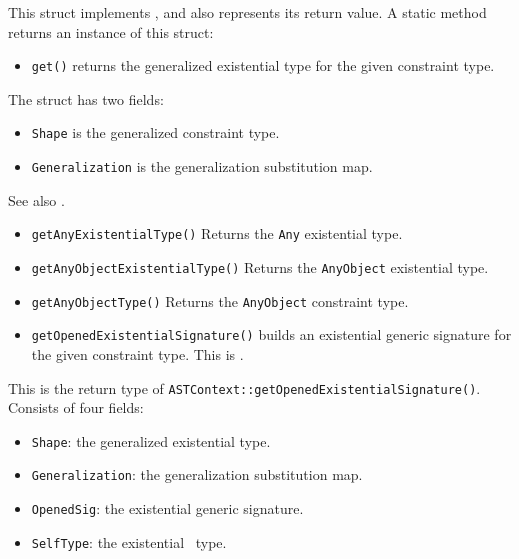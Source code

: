 \documentclass[../generics]{subfiles}
\begin{document}
This struct implements , and also represents its return value.
A static method returns an instance of this struct:
\begin{itemize}
\item \texttt{get()} returns the generalized existential type for the given constraint type.
\end{itemize}
The struct has two fields:
\begin{itemize}
\item \texttt{Shape} is the generalized constraint type.
\item \texttt{Generalization} is the generalization substitution map.
\end{itemize}

See also .
\begin{itemize}
\item \texttt{getAnyExistentialType()} Returns the \texttt{Any} existential type.
\item \texttt{getAnyObjectExistentialType()} Returns the \texttt{AnyObject} existential type.
\item \texttt{getAnyObjectType()} Returns the \texttt{AnyObject} constraint type.
\item \texttt{getOpenedExistentialSignature()} builds an existential generic signature for the given constraint type. This is .
\end{itemize}

This is the return type of \texttt{ASTContext::getOpenedExistentialSignature()}. Consists of four fields:
\begin{itemize}
\item \texttt{Shape}: the generalized existential type.
\item \texttt{Generalization}: the generalization substitution map.
\item \texttt{OpenedSig}: the existential generic signature.
\item \texttt{SelfType}: the existential \tSelf\ type.
\end{itemize}
\end{document}
